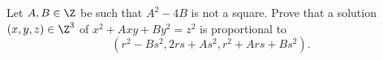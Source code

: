 \begin{exercise}
Let $A,B\in\Z$ be such that $A^2-4B$ is not a square. Prove that 
a solution $(x,y,z)\in\Z^3$ of $x^2 + Axy + By^2 = z^2$
is proportional to 
\[
(r^2-Bs^2,2rs+As^2,r^2+Ars+Bs^2).
\]
\end{exercise}


%    
%





